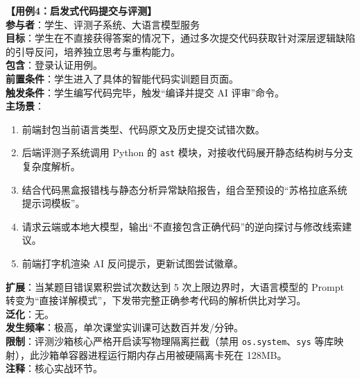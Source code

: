 \vspace{1em}
\noindent\textbf{【用例4：启发式代码提交与评测】}\\
\textbf{参与者}：学生、评测子系统、大语言模型服务\\
\textbf{目标}：学生在不直接获得答案的情况下，通过多次提交代码获取针对深层逻辑缺陷的引导反问，培养独立思考与重构能力。\\
\textbf{包含}：登录认证用例。\\
\textbf{前置条件}：学生进入了具体的智能代码实训题目页面。\\
\textbf{触发条件}：学生编写代码完毕，触发“编译并提交 AI 评审”命令。\\
\textbf{主场景}：
\begin{enumerate}
    \item 前端封包当前语言类型、代码原文及历史提交试错次数。
    \item 后端评测子系统调用 Python 的 \texttt{ast} 模块，对接收代码展开静态结构树与分支复杂度解析。
    \item 结合代码黑盒报错栈与静态分析异常缺陷报告，组合至预设的“苏格拉底系统提示词模板”。
    \item 请求云端或本地大模型，输出“不直接包含正确代码”的逆向探讨与修改线索建议。
    \item 前端打字机渲染 AI 反问提示，更新试图尝试徽章。
\end{enumerate}
\textbf{扩展}：当某题目错误累积尝试次数达到 5 次上限边界时，大语言模型的 Prompt 转变为“直接详解模式”，下发带完整正确参考代码的解析供比对学习。\\
\textbf{泛化}：无。\\
\textbf{发生频率}：极高，单次课堂实训课可达数百并发/分钟。\\
\textbf{限制}：评测沙箱核心严格开启读写物理隔离拦截（禁用 \texttt{os.system}、\texttt{sys} 等库映射），此沙箱单容器进程运行期内存占用被硬隔离卡死在 \le 128MB。\\
\textbf{注释}：核心实战环节。


